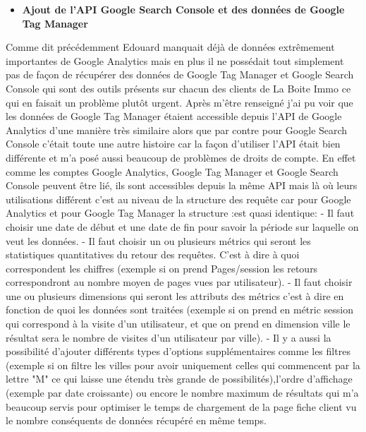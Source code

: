 \documentclass[12pt]{article}
\begin{document}
\begin{itemize}
\item \textbf{Ajout de l'API Google Search Console et des données de Google Tag Manager}
\end{itemize}

Comme dit précédemment Edouard manquait déjà de données extrêmement importantes de Google Analytics mais en plus il ne possédait tout simplement pas de façon de récupérer des données de Google Tag Manager et Google Search Console qui sont des outils présents sur chacun des clients de La Boite Immo ce qui en faisait un problème plutôt urgent. Après m'être renseigné j'ai pu voir que les données de Google Tag Manager étaient accessible depuis l'API de Google Analytics d'une manière très similaire alors que par contre pour Google Search Console c'était toute une autre histoire car la façon d'utiliser l'API était bien différente et m'a posé aussi beaucoup de problèmes de droits de compte. En effet comme les comptes Google Analytics, Google Tag Manager et Google Search Console peuvent être lié, ils sont accessibles depuis la même API mais là où leurs utilisations différent c'est au niveau de la structure des requête car pour Google Analytics et pour Google Tag Manager la structure :est quasi identique: \newline \newline
- Il faut choisir une date de début et une date de fin pour savoir la période sur laquelle on veut les données. \newline
- Il faut choisir un ou plusieurs métrics qui seront les statistiques quantitatives du retour des requêtes. C'est à dire à quoi correspondent les chiffres (exemple si on prend Pages/session les retours correspondront au nombre moyen de pages vues par utilisateur).\newline
- Il faut choisir une ou plusieurs dimensions qui seront les attributs des métrics c'est à dire en fonction de quoi les données sont traitées (exemple si on prend en métric session qui correspond à la visite d'un utilisateur, et que on prend en dimension ville le résultat sera le nombre de visites d'un utilisateur par ville).\newline
- Il y a aussi la possibilité d'ajouter différents types d'options supplémentaires comme les filtres (exemple si on filtre les villes pour avoir uniquement celles qui commencent par la lettre "M" ce qui laisse une étendu très grande de possibilités),l'ordre d'affichage (exemple par date croissante) ou encore le nombre maximum de résultats qui m'a beaucoup servis pour optimiser le temps de chargement de la page fiche client vu le nombre conséquents de données récupéré en même temps.\newline \newline
\end{document}
